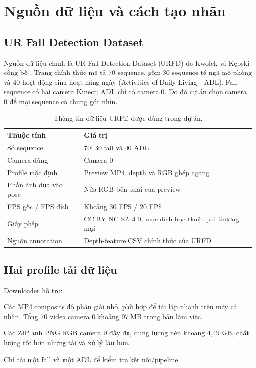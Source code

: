 \documentclass[12pt,a4paper,oneside]{report}
\newcommand{\code}[1]{\texttt{#1}}
\begin{document}
\chapter{Nguồn dữ liệu và cách tạo nhãn}

\section{UR Fall Detection Dataset}

Nguồn dữ liệu chính là UR Fall Detection Dataset (URFD) do Kwolek và Kępski
công bố \cite{urfdsite,urfdpaper}. Trang chính thức mô tả 70 sequence, gồm 30
sequence té ngã mô phỏng và 40 hoạt động sinh hoạt hằng ngày (Activities of
Daily Living - ADL). Fall sequence có hai camera Kinect; ADL chỉ có camera 0.
Do đó dự án chọn camera 0 để mọi sequence có chung góc nhìn.

\begin{table}[H]
\centering
\caption{Thông tin dữ liệu URFD được dùng trong dự án.}
\begin{tabularx}{\textwidth}{p{4.2cm}Y}
\toprule
Thuộc tính & Giá trị \\
\midrule
Số sequence & 70: 30 fall và 40 ADL \\
Camera dùng & Camera 0 \\
Profile mặc định & Preview MP4, depth và RGB ghép ngang \\
Phần ảnh đưa vào pose & Nửa RGB bên phải của preview \\
FPS gốc / FPS đích & Khoảng 30 FPS / 20 FPS \\
Giấy phép & CC BY-NC-SA 4.0, mục đích học thuật phi thương mại \\
Nguồn annotation & Depth-feature CSV chính thức của URFD \\
\bottomrule
\end{tabularx}
\end{table}

\section{Hai profile tải dữ liệu}

Downloader hỗ trợ:

\begin{description}[style=nextline]
  \item[\code{preview}] Các MP4 composite độ phân giải nhỏ, phù hợp để tái lập
  nhanh trên máy cá nhân. Tổng 70 video camera 0 khoảng 97 MB trong bản làm việc.
  \item[\code{rgb}] Các ZIP ảnh PNG RGB camera 0 đầy đủ, dung lượng nén khoảng
  4,49 GB, chất lượng tốt hơn nhưng tải và xử lý lâu hơn.
  \item[\code{smoke}] Chỉ tải một fall và một ADL để kiểm tra kết nối/pipeline.
\end{description}
\end{document}
